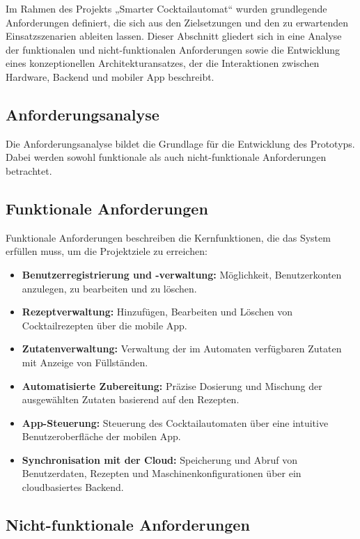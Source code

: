 Im Rahmen des Projekts „Smarter Cocktailautomat“ wurden grundlegende Anforderungen definiert, die 
sich aus den Zielsetzungen und den zu erwartenden Einsatzszenarien ableiten lassen. Dieser 
Abschnitt gliedert sich in eine Analyse der funktionalen und nicht-funktionalen Anforderungen 
sowie die Entwicklung eines konzeptionellen Architekturansatzes, der die Interaktionen zwischen 
Hardware, Backend und mobiler App beschreibt.

\subsection{Anforderungsanalyse}

Die Anforderungsanalyse bildet die Grundlage für die Entwicklung des Prototyps. Dabei werden 
sowohl funktionale als auch nicht-funktionale Anforderungen betrachtet.

\subsection{Funktionale Anforderungen}

Funktionale Anforderungen beschreiben die Kernfunktionen, die das System erfüllen muss, um die 
Projektziele zu erreichen:

\begin{itemize}
	  \item \textbf{Benutzerregistrierung und -verwaltung:} Möglichkeit, Benutzerkonten anzulegen, zu bearbeiten und zu löschen.
	  \item \textbf{Rezeptverwaltung:} Hinzufügen, Bearbeiten und Löschen von Cocktailrezepten über die mobile App.
	  \item \textbf{Zutatenverwaltung:} Verwaltung der im Automaten verfügbaren Zutaten mit Anzeige von Füllständen.
	  \item \textbf{Automatisierte Zubereitung:} Präzise Dosierung und Mischung der ausgewählten Zutaten basierend auf den Rezepten.
	  \item \textbf{App-Steuerung:} Steuerung des Cocktailautomaten über eine intuitive Benutzeroberfläche der mobilen App.
	  \item \textbf{Synchronisation mit der Cloud:} Speicherung und Abruf von Benutzerdaten, Rezepten und Maschinenkonfigurationen über ein cloudbasiertes Backend.
\end{itemize}

\subsection{Nicht-funktionale Anforderungen}


